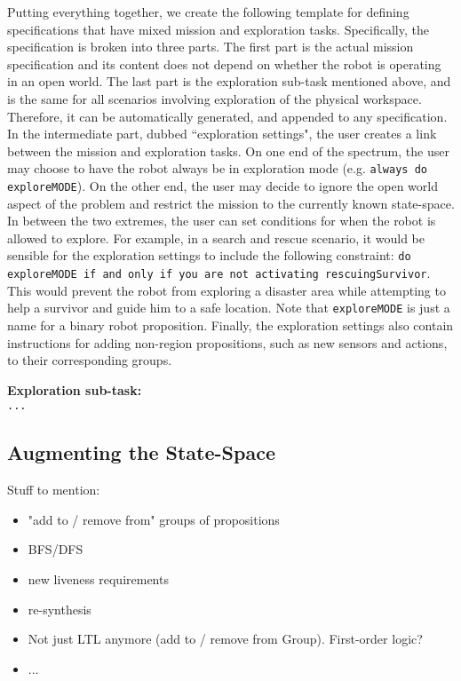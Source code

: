Putting everything together, we create the following template for defining specifications that have mixed mission and exploration tasks. Specifically, the specification is broken into three parts. The first part is the actual mission specification and its content does not depend on whether the robot is operating in an open world. The last part is the exploration sub-task mentioned above, and is the same for all scenarios involving exploration of the physical workspace. Therefore, it can be automatically generated, and appended to any specification. In the intermediate part, dubbed ``exploration settings", the user creates a link between the mission and exploration tasks. On one end of the spectrum, the user may choose to have the robot always be in exploration mode (e.g. \texttt{always do exploreMODE}). On the other end, the user may decide to ignore the open world aspect of the problem and restrict the mission to the currently known state-space. In between the two extremes, the user can set conditions for when the robot is allowed to explore. For example, in a search and rescue scenario, it would be sensible for the exploration settings to include the following constraint: \texttt{do exploreMODE if and only if you are not activating rescuingSurvivor}. This would prevent the robot from exploring a disaster area while attempting to help a survivor and guide him to a safe location. Note that \texttt{exploreMODE} is just a name for a binary robot proposition. Finally, the exploration settings also contain instructions for adding non-region propositions, such as new sensors and actions, to their corresponding groups.

\begin{algorithm}
	\textbf{Exploration sub-task:}\\
	{\small
	\texttt{...}
	}
\end{algorithm}

\subsection{Augmenting the State-Space} %

Stuff to mention:
\begin{itemize}
	\item "add to / remove from" groups of propositions
	\item BFS/DFS
	\item new liveness requirements
	\item re-synthesis
	\item Not just LTL anymore (add to / remove from Group). First-order logic?
	\item ...
\end{itemize}

